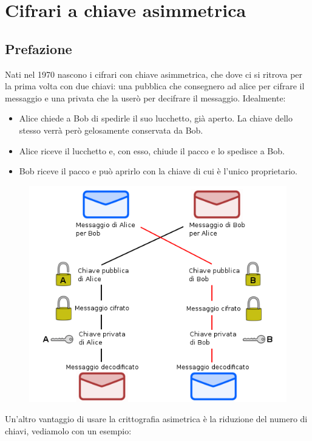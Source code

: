 \documentclass[10pt,a4paper]{article}
\begin{document}
\section{Cifrari a chiave asimmetrica}
\subsection{Prefazione}
Nati nel 1970 nascono i cifrari con chiave asimmetrica, che dove ci si ritrova per la prima volta con due chiavi: una pubblica che consegnero ad alice per cifrare il messaggio e una privata che la userò per decifrare il messaggio. Idealmente:
\begin{itemize}
\item Alice chiede a Bob di spedirle il suo lucchetto, già aperto. La chiave dello stesso verrà però gelosamente conservata da Bob.
\item Alice riceve il lucchetto e, con esso, chiude il pacco e lo spedisce a Bob.
\item Bob riceve il pacco e può aprirlo con la chiave di cui è l'unico proprietario.
\end{itemize}

\begin{figure}[htbp]
\includegraphics[scale=0.4]{immagini/Crittografia_asimmetrica_schema.png}
\end{figure}

Un'altro vantaggio di usare la crittografia asimetrica è la riduzione del numero di chiavi, vediamolo con un esempio:\\
\end{document}
